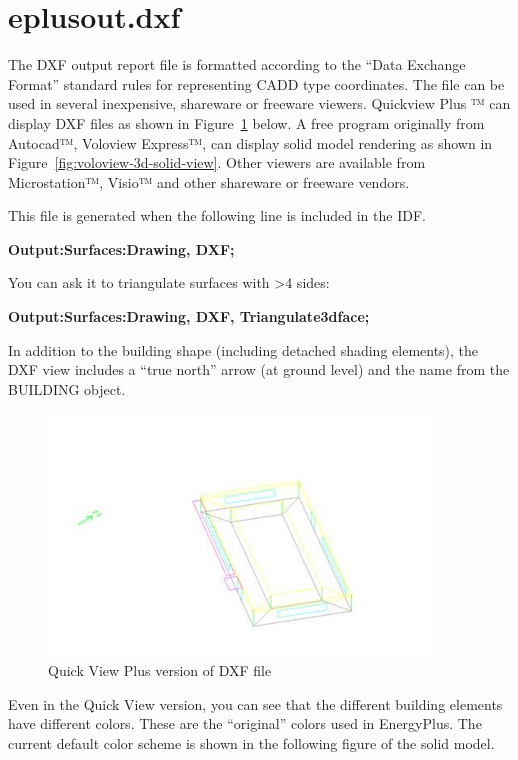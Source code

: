 \section{eplusout.dxf}\label{eplusout.dxf}

The DXF output report file is formatted according to the ``Data Exchange Format'' standard rules for representing CADD type coordinates. The file can be used in several inexpensive, shareware or freeware viewers. Quickview Plus ™ can display DXF files as shown in Figure~\ref{fig:quick-view-plus-version-of-dxf-file} below. A free program originally from Autocad™, Voloview Express™, can display solid model rendering as shown in Figure~\ref{fig:voloview-3d-solid-view}. Other viewers are available from Microstation™, Visio™ and other shareware or freeware vendors.

This file is generated when the following line is included in the IDF.

\textbf{Output:Surfaces:Drawing, DXF;}

You can ask it to triangulate surfaces with \textgreater{}4 sides:

\textbf{Output:Surfaces:Drawing, DXF, Triangulate3dface;}

In addition to the building shape (including detached shading elements), the DXF view includes a ``true north'' arrow (at ground level) and the name from the BUILDING object.

\begin{figure}[hbtp] %
\centering
\includegraphics[width=0.9\textwidth, height=0.9\textheight, keepaspectratio=true]{media/image001.jpg}
\caption{Quick View Plus version of DXF file \protect \label{fig:quick-view-plus-version-of-dxf-file}}
\end{figure}

Even in the Quick View version, you can see that the different building elements have different colors. These are the ``original'' colors used in EnergyPlus. The current default color scheme is shown in the following figure of the solid model.

